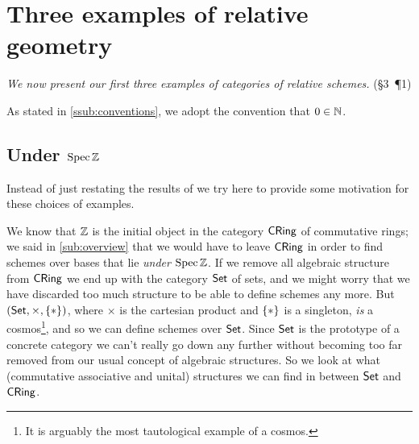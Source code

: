 
\section{Three examples of relative geometry} %
\label{sec:three_examples_of_relative_geometry}

    \emph{We now present our first three examples of categories of relative schemes.} (\S3~\P1)

    \begin{note}
        As stated in \cref{ssub:conventions}, we adopt the convention that $0\in\mathbb{N}$.
    \end{note}

    \subsection{Under $\operatorname{Spec}\mathbb{Z}$} %
    \label{sub:under_}

        Instead of just restating the results of \cite[\S3.1--3.3,~4]{Toen:2005wxa} we try here to provide some motivation for these choices of examples.

        \bigskip

        We know that $\mathbb{Z}$ is the initial object in the category $\mathsf{CRing}$ of commutative rings; we said in \cref{sub:overview} that we would have to leave $\mathsf{CRing}$ in order to find schemes over bases that lie \emph{under} $\operatorname{Spec}\mathbb{Z}$.
        If we remove all algebraic structure from $\mathsf{CRing}$ we end up with the category $\mathsf{Set}$ of sets, and we might worry that we have discarded too much structure to be able to define schemes any more.
        But $(\mathsf{Set},\times,\{*\})$, where $\times$ is the cartesian product and $\{*\}$ is a singleton, \emph{is} a cosmos\footnote{
            It is arguably the most tautological example of a cosmos.
        }, and so we can define schemes over $\mathsf{Set}$.
        Since $\mathsf{Set}$ is the prototype of a concrete category we can't really go down any further without becoming too far removed from our usual concept of algebraic structures.
        So we look at what (commutative associative and unital) structures we can find in between $\mathsf{Set}$ and $\mathsf{CRing}$.


